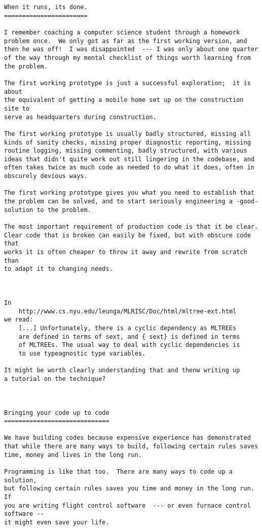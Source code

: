 \begin{verbatim}
When it runs, its done. 
======================= 

I remember coaching a computer science student through a homework 
problem once.  We only got as far as the first working version, and 
then he was off!  I was disappointed  --- I was only about one quarter 
of the way through my mental checklist of things worth learning from 
the problem. 

The first working prototype is just a successful exploration;  it is about 
the equivalent of getting a mobile home set up on the construction site to 
serve as headquarters during construction. 

The first working prototype is usually badly structured, missing all 
kinds of sanity checks, missing proper diagnostic reporting, missing 
routine logging, missing commenting, badly structured, with various 
ideas that didn't quite work out still lingering in the codebase, and 
often takes twice as much code as needed to do what it does, often in 
obscurely devious ways. 

The first working prototype gives you what you need to establish that 
the problem can be solved, and to start seriously engineering a -good- 
solution to the problem. 

The most important requirement of production code is that it be clear. 
Clear code that is broken can easily be fixed, but with obscure code that 
works it is often cheaper to throw it away and rewrite from scratch than 
to adapt it to changing needs. 



In 
    http://www.cs.nyu.edu/leunga/MLRISC/Doc/html/mltree-ext.html 
we read: 
    [...] Unfortunately, there is a cyclic dependency as MLTREEs 
    are defined in terms of sext, and { sext} is defined in terms 
    of MLTREEs. The usual way to deal with cyclic dependencies is 
    to use typeagnostic type variables. 

It might be worth clearly understanding that and thenw writing up 
a tutorial on the technique? 



Bringing your code up to code 
============================= 

We have building codes because expensive experience has demonstrated 
that while there are many ways to build, following certain rules saves 
time, money and lives in the long run. 

Programming is like that too.  There are many ways to code up a solution, 
but following certain rules saves you time and money in the long run.  If 
you are writing flight control software  --- or even furnace control software -- 
it might even save your life. 






\end{verbatim}
